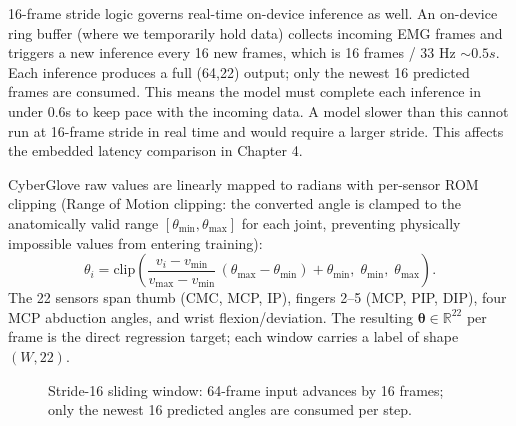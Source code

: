 \documentclass[11pt]{article}
\begin{document}
16-frame stride logic governs real-time on-device inference as well.  An on-device ring buffer (where we temporarily hold data) collects incoming EMG frames and triggers a new inference every 16 new frames, which is 16 frames / 33 Hz $\sim 0.5s $. Each inference produces a full (64,22) output; only the newest 16 predicted frames are consumed. This means the model must complete each inference in under 0.6s to keep pace with the incoming data. A model slower than this cannot run at 16-frame stride in real time and would require a larger stride. This affects the embedded latency comparison in Chapter 4. 

CyberGlove raw values are linearly mapped to radians with per-sensor ROM clipping (Range of Motion clipping: the converted angle is clamped to the anatomically valid range $[\theta_{\min}, \theta_{\max}]$ for each joint, preventing physically impossible values from entering training):
\begin{equation}
\theta_i = \mathrm{clip}\!\left(\frac{v_i - v_{\min}}{v_{\max} - v_{\min}}\,(\theta_{\max} - \theta_{\min}) + \theta_{\min},\;\theta_{\min},\;\theta_{\max}\right).
\end{equation}
The 22 sensors span thumb (CMC, MCP, IP), fingers 2--5 (MCP, PIP, DIP), four MCP abduction angles, and wrist flexion/deviation. The resulting $\boldsymbol{\theta}\in\mathbb{R}^{22}$ per frame is the direct regression target; each window carries a label of shape $(W,22)$.

\begin{figure}[H]
\centering
{}
\caption{Stride-16 sliding window: 64-frame input advances by 16 frames; only the newest 16 predicted angles are consumed per step.}
\label{fig:stride}
\end{figure}
\end{document}
